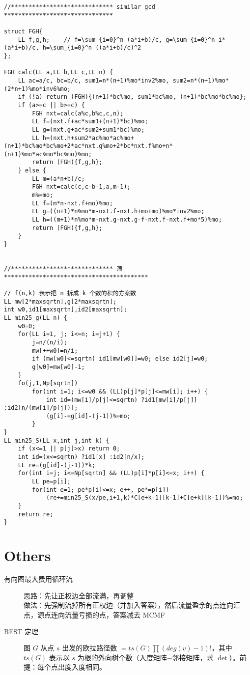 \documentclass{article}
\begin{document}
\begin{multicols}{2}
\begin{lstlisting}
//***************************** similar gcd *******************************

struct FGH{
    LL f,g,h;    // f=\sum_{i=0}^n (a*i+b)/c, g=\sum_{i=0}^n i*(a*i+b)/c, h=\sum_{i=0}^n ((a*i+b)/c)^2
};

FGH calc(LL a,LL b,LL c,LL n) {
    LL ac=a/c, bc=b/c, sum1=n*(n+1)%mo*inv2%mo, sum2=n*(n+1)%mo*(2*n+1)%mo*inv6%mo;
    if (!a) return (FGH){(n+1)*bc%mo, sum1*bc%mo, (n+1)*bc%mo*bc%mo};
    if (a>=c || b>=c) {
        FGH nxt=calc(a%c,b%c,c,n);
        LL f=(nxt.f+ac*sum1+(n+1)*bc)%mo;
        LL g=(nxt.g+ac*sum2+sum1*bc)%mo;
        LL h=(nxt.h+sum2*ac%mo*ac%mo+(n+1)*bc%mo*bc%mo+2*ac*nxt.g%mo+2*bc*nxt.f%mo+n*(n+1)%mo*ac%mo*bc%mo)%mo;
        return (FGH){f,g,h};
    } else {
        LL m=(a*n+b)/c;
        FGH nxt=calc(c,c-b-1,a,m-1);
        m%=mo;
        LL f=(m*n-nxt.f+mo)%mo;
        LL g=((n+1)*n%mo*m-nxt.f-nxt.h+mo+mo)%mo*inv2%mo;
        LL h=((m+1)*n%mo*m-nxt.g-nxt.g-f-nxt.f-nxt.f+mo*5)%mo;
        return (FGH){f,g,h};
    }
}


//***************************** 筛 *****************************************

// f(n,k) 表示把 n 拆成 k 个数的积的方案数
LL mw[2*maxsqrtn],g[2*maxsqrtn];
int w0,id1[maxsqrtn],id2[maxsqrtn];
LL min25_g(LL n) {
    w0=0;
    for(LL i=1, j; i<=n; i=j+1) {
        j=n/(n/i);
        mw[++w0]=n/i;
        if (mw[w0]<=sqrtn) id1[mw[w0]]=w0; else id2[j]=w0;
        g[w0]=mw[w0]-1;
    }
    fo(j,1,Np[sqrtn])
        for(int i=1; i<=w0 && (LL)p[j]*p[j]<=mw[i]; i++) {
            int id=(mw[i]/p[j]<=sqrtn) ?id1[mw[i]/p[j]] :id2[n/(mw[i]/p[j])];
            (g[i]-=g[id]-(j-1))%=mo;
        }
}
LL min25_S(LL x,int j,int k) {
    if (x<=1 || p[j]>x) return 0;
    int id=(x<=sqrtn) ?id1[x] :id2[n/x];
    LL re=(g[id]-(j-1))*k;
    for(int i=j; i<=Np[sqrtn] && (LL)p[i]*p[i]<=x; i++) {
        LL pe=p[i];
        for(int e=1; pe*p[i]<=x; e++, pe*=p[i])
            (re+=min25_S(x/pe,i+1,k)*C[e+k-1][k-1]+C[e+k][k-1])%=mo;
    }
    return re;
}
\end{lstlisting}

\section{Others}

\begin{description}
  \item[有向图最大费用循环流] 思路：先让正权边全部流满，再调整 \\
      做法：先强制流掉所有正权边（并加入答案），然后流量盈余的点连向汇点，源点连向流量亏损的点，答案减去 MCMF
  \item[BEST 定理] 图 $G$ 从点 $s$ 出发的欧拉路径数 $= ts(G) \prod (deg(v)-1)!$，其中 $ts(G)$ 表示以 $s$ 为根的外向树个数（入度矩阵$-$邻接矩阵，求 $\det$）。前提：每个点出度入度相同。
\end{description}


\end{multicols}
\end{document}
